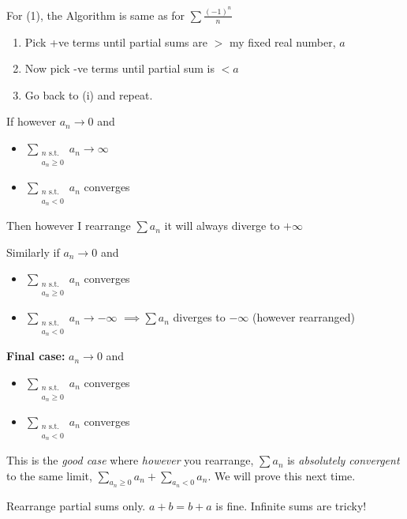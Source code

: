  For (1), the Algorithm is same as for $\sum \frac{(-1)^n}{n}$	
 \begin{enumerate}
 \item Pick +ve terms until partial sums are $>$ my fixed real number, $a$
 \item Now pick -ve terms until partial sum is $< a$
 \item Go back to (i) and repeat.
 \end{enumerate}
 
 If however $a_n \to 0$ and 
 \begin{itemize}
 	\item $\displaystyle{\sum_{\substack{n \text{ s.t.} \\a_n \geq 0}} a_n} \to \infty$
 \item $\displaystyle{\sum_{\substack{n \text{ s.t.}\\ a_n < 0}}  a_n}$ converges
 \end{itemize}
 Then however I rearrange $\sum a_n$ it will always diverge to $+ \infty$
 
 Similarly if $a_n \to 0$ and 
 
  \begin{itemize}
 	\item $\displaystyle{\sum_{\substack{n \text{ s.t.} \\a_n \geq 0}} a_n}$ converges
 \item $\displaystyle{\sum_{\substack{n \text{ s.t.}\\ a_n < 0}}  a_n} \to -\infty$
 $\implies  \sum a_n$ diverges to $-\infty$ (however rearranged)
 \end{itemize}
 
\textbf{ Final case:} $a_n \to 0$ and 
 \begin{itemize}
 	\item $\displaystyle{\sum_{\substack{n \text{ s.t.} \\a_n \geq 0}} a_n}$ converges
 \item $\displaystyle{\sum_{\substack{n \text{ s.t.}\\ a_n < 0}}  a_n}$ converges
 \end{itemize}
This is the \emph{good case} where \emph{however} you rearrange, $\sum a_n$ is \emph{absolutely convergent} to the same limit, $\sum_{a_n \geq 0} a_n + \sum_{a_n < 0} a_n$. 
We will prove this next time.\\

\begin{remark} Rearrange partial sums only. $a+ b = b+a$ is fine. Infinite sums are tricky!	
\end{remark}



